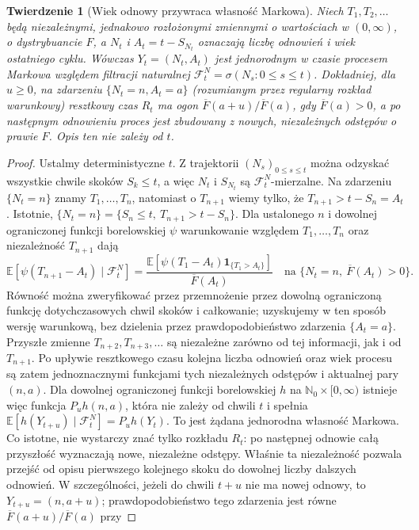 \documentclass[11pt,a4paper,oneside]{report}
\numberwithin{equation}{chapter}
\theoremstyle{plain}
\newtheorem{twierdzenie}{Twierdzenie}[chapter]
\theoremstyle{definition}
\theoremstyle{remark}
\newcommand{\N}{\mathbb{N}}
\newcommand{\E}{\mathbb{E}}
\newcommand{\calF}{\mathcal{F}}
\newcommand{\ind}[1]{\mathbf{1}_{#1}}
\begin{document}
\begin{twierdzenie}[Wiek odnowy przywraca własność Markowa]
\label{thm:wiek-markow}
Niech $T_1,T_2,\ldots$ będą niezależnymi, jednakowo rozłożonymi
zmiennymi o wartościach w $(0,\infty)$, o dystrybuancie $F$,
a $N_t$ i $A_t=t-S_{N_t}$ oznaczają liczbę odnowień i wiek
ostatniego cyklu. Wówczas $Y_t=(N_t,A_t)$ jest jednorodnym
w czasie procesem Markowa względem filtracji naturalnej
$\calF_t^N=\sigma(N_s:0\le s\le t)$.
Dokładniej, dla $u\ge0$, na zdarzeniu $\{N_t=n,A_t=a\}$
(rozumianym przez regularny rozkład warunkowy) resztkowy czas
$R_t$ ma ogon
$\overline F(a+u)/\overline F(a)$, gdy $\overline F(a)>0$,
a po następnym odnowieniu proces jest zbudowany z nowych,
niezależnych odstępów o prawie $F$. Opis ten nie zależy od $t$.
\end{twierdzenie}
\begin{proof}
Ustalmy deterministyczne $t$. Z trajektorii $(N_s)_{0\le s\le t}$
można odzyskać wszystkie chwile skoków $S_k\le t$, a więc
$N_t$ i $S_{N_t}$ są $\calF_t^N$-mierzalne. Na zdarzeniu
$\{N_t=n\}$ znamy $T_1,\ldots,T_n$, natomiast o $T_{n+1}$
wiemy tylko, że $T_{n+1}>t-S_n=A_t$. Istotnie,
$\{N_t=n\}=\{S_n\le t,\ T_{n+1}>t-S_n\}$.
Dla ustalonego $n$ i dowolnej ograniczonej funkcji borelowskiej
$\psi$ warunkowanie względem $T_1,\ldots,T_n$ oraz
niezależność $T_{n+1}$ dają
\[
\E[\psi(T_{n+1}-A_t)\mid\calF_t^N]
=\frac{\E[\psi(T_1-A_t)\ind{\{T_1>A_t\}}]}{\overline F(A_t)}
\quad\text{na }\{N_t=n,\ \overline F(A_t)>0\}.
\]
Równość można zweryfikować przez przemnożenie przez dowolną
ograniczoną funkcję dotychczasowych chwil skoków i całkowanie;
uzyskujemy w ten sposób wersję warunkową, bez dzielenia przez
prawdopodobieństwo zdarzenia $\{A_t=a\}$.
Przyszłe zmienne $T_{n+2},T_{n+3},\ldots$ są niezależne zarówno
od tej informacji, jak i od $T_{n+1}$. Po upływie resztkowego
czasu kolejna liczba odnowień oraz wiek procesu są zatem
jednoznacznymi funkcjami tych niezależnych odstępów i
aktualnej pary $(n,a)$. Dla dowolnej ograniczonej funkcji
borelowskiej $h$ na $\N_0\times[0,\infty)$ istnieje więc
funkcja $P_uh(n,a)$, która nie zależy od chwili $t$ i spełnia
$\E[h(Y_{t+u})\mid\calF_t^N]=P_uh(Y_t)$.
To jest żądana jednorodna własność Markowa.
Co istotne, nie wystarczy znać tylko rozkładu $R_t$:
po następnej odnowie całą przyszłość wyznaczają nowe,
niezależne odstępy. Właśnie ta niezależność pozwala
przejść od opisu pierwszego kolejnego skoku do dowolnej
liczby dalszych odnowień.
W szczególności, jeżeli do chwili $t+u$ nie ma nowej odnowy,
to $Y_{t+u}=(n,a+u)$; prawdopodobieństwo tego zdarzenia
jest równe $\overline F(a+u)/\overline F(a)$ przy

\end{proof}
\end{document}
